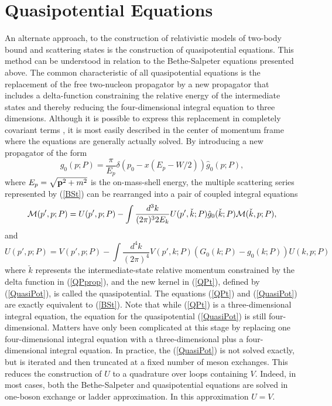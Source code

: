 \documentclass[mythesis.tex]{subfiles}
\begin{document}
\section{Quasipotential Equations}

An alternate approach, to the construction of relativistic models of two-body
bound and scattering states is the construction of quasipotential equations.
This method can be understood in relation to the Bethe-Salpeter equations
presented above. The common characteristic of all quasipotential equations
is the replacement of the free two-nucleon propagator by a new propagator
that includes a delta-function constraining the relative energy of the
intermediate states and thereby reducing the four-dimensional integral
equation to three dimensions. Although it is possible to express this
replacement in completely covariant terms \cite{BrownandJ}, it is most
easily described in
the center of momentum frame where the equations are generally actually
solved. By introducing a new propagator of the form
\begin{equation}
g_0(p;P)=\frac{\pi}{E_p}\delta\left( p_0-x(E_p-W/2)\right) \hat g_0(p;P),
\label{QPprop}
\end{equation}
where $E_p=\sqrt{{\bf p}^2+m^2}$ is the on-mass-shell energy,
the multiple scattering series represented by (\ref{BSt}) can be rearranged
into a pair of coupled integral equations
\begin{equation}
{\cal M}(p',p;P)=U(p',p;P)-\int\frac{d^3k}{(2\pi)^3 2 E_k} U(p',\check k;P)
\hat g_0(\check k;P)
{\cal M}(\check k,p;P),\label{QPt}
\end{equation}
and
\begin{equation}
U(p',p;P)=V(p',p;P)-\int\frac{d^4k}{(2\pi)^4} V(p',k;P)\left( G_0(k;P)
-g_0(k;P)\right) U(k,p;P)\label{QuasiPot}
\end{equation}
where $\check k$ represents the intermediate-state relative momentum
constrained by the delta function in (\ref{QPprop}), and the new kernel
in (\ref{QPt}), defined by (\ref{QuasiPot}), is called the quasipotential.
The equations (\ref{QPt}) and (\ref{QuasiPot}) are exactly equivalent to
(\ref{BSt}). Note that while (\ref{QPt}) is a three-dimensional integral
equation, the equation for the quasipotential (\ref{QuasiPot}) is still
four-dimensional. Matters have only been complicated at this stage by
replacing one four-dimensional integral equation with a three-dimensional
plus a four-dimensional integral equation. In practice, the (\ref{QuasiPot})
is not solved exactly, but is iterated and then truncated at a fixed number
of meson exchanges. This reduces the construction of $U$ to a quadrature over loops
containing $V$. Indeed, in most cases, both the Bethe-Salpeter and
quasipotential equations are solved in one-boson exchange or ladder
approximation. In this approximation $U=V$.
\end{document}
